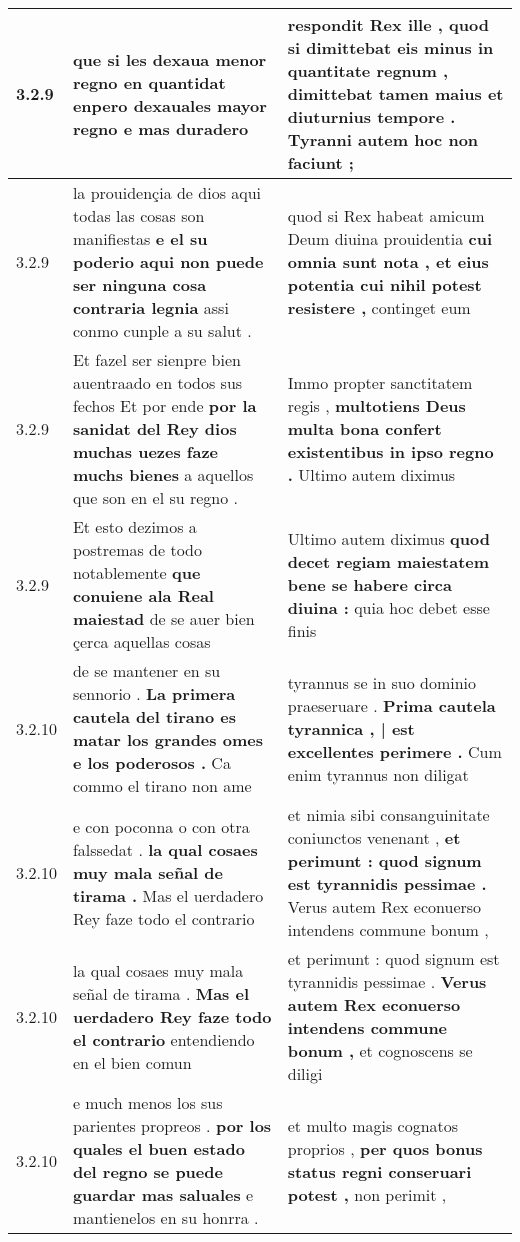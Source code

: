 \begin{tabular}{|p{1cm}|p{6.5cm}|p{6.5cm}|}
3.2.9 & que si les dexaua menor regno \textbf{ en quantidat enpero dexauales mayor regno } e mas duradero & respondit Rex ille , \textbf{ quod si dimittebat eis minus in quantitate regnum , dimittebat } tamen maius et diuturnius tempore . Tyranni autem hoc non faciunt ; \\\hline
3.2.9 & la prouidençia de dios aqui todas las cosas son manifiestas \textbf{ e el su poderio aqui non puede ser ninguna cosa contraria legnia } assi conmo cunple a su salut . & quod si Rex habeat amicum Deum diuina prouidentia \textbf{ cui omnia sunt nota , et eius potentia cui nihil potest resistere , } continget eum \\\hline
3.2.9 & Et fazel ser sienpre bien auentraado en todos sus fechos Et por ende \textbf{ por la sanidat del Rey dios muchas uezes faze muchs bienes } a aquellos que son en el su regno . & Immo propter sanctitatem regis , \textbf{ multotiens Deus multa bona confert existentibus in ipso regno . } Ultimo autem diximus \\\hline
3.2.9 & Et esto dezimos a postremas de todo notablemente \textbf{ que conuiene ala Real maiestad } de se auer bien çerca aquellas cosas & Ultimo autem diximus \textbf{ quod decet regiam maiestatem bene se habere circa diuina : } quia hoc debet esse finis \\\hline
3.2.10 & de se mantener en su sennorio . \textbf{ La primera cautela del tirano es matar los grandes omes e los poderosos . } Ca commo el tirano non ame & tyrannus se in suo dominio praeseruare . \textbf{ Prima cautela tyrannica , | est excellentes perimere . } Cum enim tyrannus non diligat \\\hline
3.2.10 & e con poconna o con otra falssedat . \textbf{ la qual cosaes muy mala señal de tirama . } Mas el uerdadero Rey faze todo el contrario & et nimia sibi consanguinitate coniunctos venenant , \textbf{ et perimunt : quod signum est tyrannidis pessimae . } Verus autem Rex econuerso intendens commune bonum , \\\hline
3.2.10 & la qual cosaes muy mala señal de tirama . \textbf{ Mas el uerdadero Rey faze todo el contrario } entendiendo en el bien comun & et perimunt : quod signum est tyrannidis pessimae . \textbf{ Verus autem Rex econuerso intendens commune bonum , } et cognoscens se diligi \\\hline
3.2.10 & e much menos los sus parientes propreos . \textbf{ por los quales el buen estado del regno se puede guardar mas saluales } e mantienelos en su honrra . & et multo magis cognatos proprios , \textbf{ per quos bonus status regni conseruari potest , } non perimit , \\\hline

\end{tabular}
